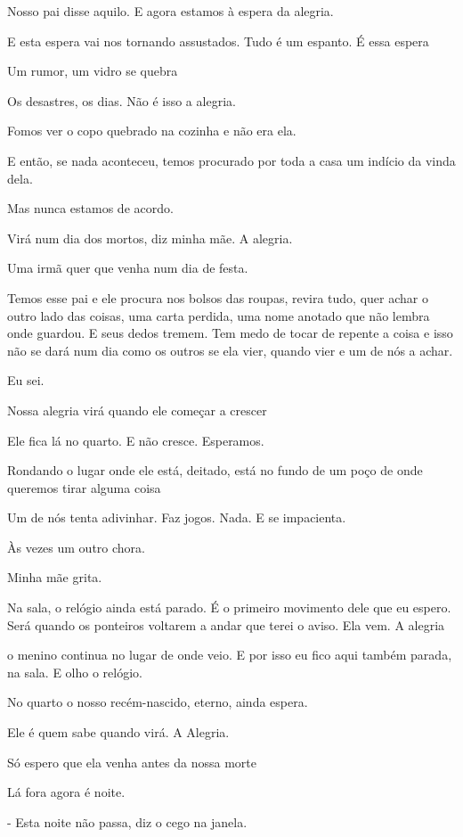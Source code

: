 Nosso pai disse aquilo. E agora estamos à espera da alegria.

E esta espera vai nos tornando assustados. Tudo é um espanto. É essa
espera

Um rumor, um vidro se quebra

Os desastres, os dias. Não é isso a alegria.

Fomos ver o copo quebrado na cozinha e não era ela.

E então, se nada aconteceu, temos procurado por toda a casa um indício
da vinda dela.

Mas nunca estamos de acordo.

Virá num dia dos mortos, diz minha mãe. A alegria.

Uma irmã quer que venha num dia de festa.

Temos esse pai e ele procura nos bolsos das roupas, revira tudo, quer
achar o outro lado das coisas, uma carta perdida, uma nome anotado que
não lembra onde guardou. E seus dedos tremem. Tem medo de tocar de
repente a coisa e isso não se dará num dia como os outros se ela vier,
quando vier e um de nós a achar.

Eu sei.

Nossa alegria virá quando ele começar a crescer

Ele fica lá no quarto. E não cresce. Esperamos.

Rondando o lugar onde ele está, deitado, está no fundo de um poço de
onde queremos tirar alguma coisa

Um de nós tenta adivinhar. Faz jogos. Nada. E se impacienta.

Às vezes um outro chora.

Minha mãe grita.

Na sala, o relógio ainda está parado. É o primeiro movimento dele que eu
espero. Será quando os ponteiros voltarem a andar que terei o aviso. Ela
vem. A alegria

o menino continua no lugar de onde veio. E por isso eu fico aqui também
parada, na sala. E olho o relógio.

No quarto o nosso recém-nascido, eterno, ainda espera.

Ele é quem sabe quando virá. A Alegria.

Só espero que ela venha antes da nossa morte

\pagebreak

Lá fora agora é noite.

- Esta noite não passa, diz o cego na janela.


